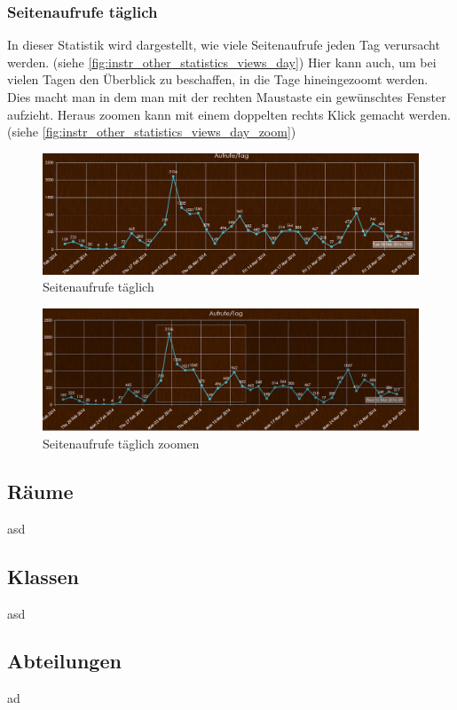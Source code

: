 \subsubsection{Seitenaufrufe täglich}
In dieser Statistik wird dargestellt, wie viele Seitenaufrufe jeden Tag verursacht werden. (siehe \autoref{fig:instr_other_statistics_views_day}) Hier kann auch, um bei vielen Tagen den Überblick zu beschaffen, in die Tage hineingezoomt werden. Dies macht man in dem man mit der rechten Maustaste ein gewünschtes Fenster aufzieht. Heraus zoomen kann mit einem doppelten rechts Klick gemacht werden. (siehe \autoref{fig:instr_other_statistics_views_day_zoom})
\begin{figure}[H]
\centering
\includegraphics[keepaspectratio=true, width=17cm]{images/screenshots/statistics_views_day.png}
\caption{Seitenaufrufe täglich}
\label{fig:instr_other_statistics_views_day}
\end{figure}
\begin{figure}[H]
\centering
\includegraphics[keepaspectratio=true, width=17cm]{images/screenshots/statistics_views_day_zoom.png}
\caption{Seitenaufrufe täglich zoomen}
\label{fig:instr_other_statistics_views_day_zoom}
\end{figure}
\subsection{Räume}
asd
\subsection{Klassen}
asd
\subsection{Abteilungen}
ad